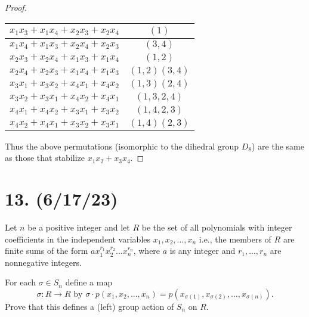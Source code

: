 \documentclass{article}
\begin{document}
\begin{enumerate}[label=(\alph*)]
\begin{proof}
            \begin{center}
              \begin{tabular}{ |c|c| } 
                \hline
                $x_1 x_3 + x_1 x_4 + x_2 x_3 + x_2 x_4$ & $(1)$ \\
                \hline
                $x_1 x_4 + x_1 x_3 + x_2 x_4 + x_2 x_3$ & $(3, 4)$ \\
                \hline
                $x_2 x_3 + x_2 x_4 + x_1 x_3 + x_1 x_4$ & $(1, 2)$ \\
                \hline
                $x_2 x_4 + x_2 x_3 + x_1 x_4 + x_1 x_3$ & $(1, 2)(3, 4)$ \\
                \hline
                $x_3 x_1 + x_3 x_2 + x_4 x_1 + x_4 x_2$ & $(1, 3)(2, 4)$ \\
                \hline
                $x_3 x_2 + x_3 x_1 + x_4 x_2 + x_4 x_1$ & $(1, 3, 2, 4)$ \\
                \hline
                $x_4 x_1 + x_4 x_2 + x_3 x_1 + x_3 x_2$ & $(1, 4, 2, 3)$ \\
                \hline
                $x_4 x_2 + x_4 x_1 + x_3 x_2 + x_3 x_1$ & $(1, 4)(2, 3)$ \\
                \hline
              \end{tabular}
            \end{center}

            Thus the above permutations (isomorphic to the dihedral group $D_8$) are the same as those that stabilize $x_1 x_2 + x_3 x_4$.
          \end{proof}
\end{enumerate}

\section*{13. (6/17/23)}

Let $n$ be a positive integer and let $R$ be the set of all polynomials with integer coefficients in the independent variables $x_1, x_2, ..., x_n$ i.e., the members of $R$ are finite sums of the form $ax_1^{r_1}x_2^{r_2}...x_n^{r_n}$, where $a$ is any integer and $r_1, ..., r_n$ are nonnegative integers.

For each $\sigma \in S_n$ define a map
\begin{equation*}
  \sigma: R \rightarrow R \text{ by } \sigma \cdot p(x_1, x_2, ..., x_n) = p(x_{\sigma(1)}, x_{\sigma(2)}, ..., x_{\sigma(n)}).
\end{equation*}
Prove that this defines a (left) group action of $S_n$ on $R$.
\end{document}
